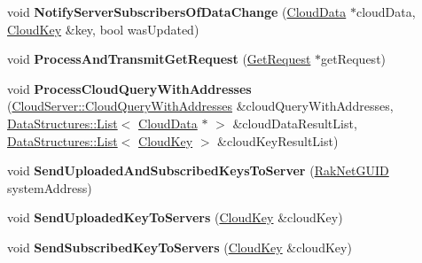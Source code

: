 \begin{DoxyCompactItemize}
\item 
\hypertarget{class_rak_net_1_1_cloud_server_ac413dc5ff8a99d4a4099ae922b35576b}{void {\bfseries Notify\-Server\-Subscribers\-Of\-Data\-Change} (\hyperlink{struct_rak_net_1_1_cloud_server_1_1_cloud_data}{Cloud\-Data} $\ast$cloud\-Data, \hyperlink{struct_rak_net_1_1_cloud_key}{Cloud\-Key} \&key, bool was\-Updated)}\label{class_rak_net_1_1_cloud_server_ac413dc5ff8a99d4a4099ae922b35576b}

\item 
\hypertarget{class_rak_net_1_1_cloud_server_a342891f0b7a66ce157ecb0f8f6bb6769}{void {\bfseries Process\-And\-Transmit\-Get\-Request} (\hyperlink{struct_rak_net_1_1_cloud_server_1_1_get_request}{Get\-Request} $\ast$get\-Request)}\label{class_rak_net_1_1_cloud_server_a342891f0b7a66ce157ecb0f8f6bb6769}

\item 
\hypertarget{class_rak_net_1_1_cloud_server_a0f9488dc721558e7ad811d6ea62fda78}{void {\bfseries Process\-Cloud\-Query\-With\-Addresses} (\hyperlink{struct_rak_net_1_1_cloud_server_1_1_cloud_query_with_addresses}{Cloud\-Server\-::\-Cloud\-Query\-With\-Addresses} \&cloud\-Query\-With\-Addresses, \hyperlink{class_data_structures_1_1_list}{Data\-Structures\-::\-List}$<$ \hyperlink{struct_rak_net_1_1_cloud_server_1_1_cloud_data}{Cloud\-Data} $\ast$ $>$ \&cloud\-Data\-Result\-List, \hyperlink{class_data_structures_1_1_list}{Data\-Structures\-::\-List}$<$ \hyperlink{struct_rak_net_1_1_cloud_key}{Cloud\-Key} $>$ \&cloud\-Key\-Result\-List)}\label{class_rak_net_1_1_cloud_server_a0f9488dc721558e7ad811d6ea62fda78}

\item 
\hypertarget{class_rak_net_1_1_cloud_server_aadd500ea0fd5dee7c5b0c76b47b42e12}{void {\bfseries Send\-Uploaded\-And\-Subscribed\-Keys\-To\-Server} (\hyperlink{struct_rak_net_1_1_rak_net_g_u_i_d}{Rak\-Net\-G\-U\-I\-D} system\-Address)}\label{class_rak_net_1_1_cloud_server_aadd500ea0fd5dee7c5b0c76b47b42e12}

\item 
\hypertarget{class_rak_net_1_1_cloud_server_a79aef423d73eac63d5005a544bfa846d}{void {\bfseries Send\-Uploaded\-Key\-To\-Servers} (\hyperlink{struct_rak_net_1_1_cloud_key}{Cloud\-Key} \&cloud\-Key)}\label{class_rak_net_1_1_cloud_server_a79aef423d73eac63d5005a544bfa846d}

\item 
\hypertarget{class_rak_net_1_1_cloud_server_ad3dd03eea7bb57a9a8e1b9c5be5d2071}{void {\bfseries Send\-Subscribed\-Key\-To\-Servers} (\hyperlink{struct_rak_net_1_1_cloud_key}{Cloud\-Key} \&cloud\-Key)}\label{class_rak_net_1_1_cloud_server_ad3dd03eea7bb57a9a8e1b9c5be5d2071}


\end{DoxyCompactItemize}
